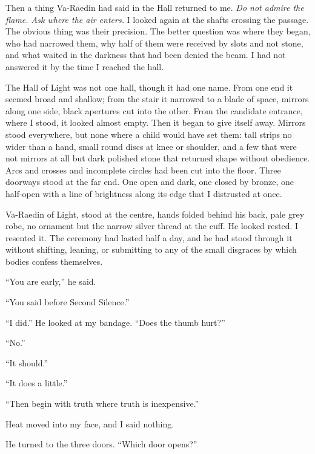 Then a thing Va-Raedin had said in the Hall returned to me. \textit{Do not admire the flame. Ask where the air enters.}
I looked again at the shafts crossing the passage.
The obvious thing was their precision.
The better question was where they began, who had narrowed them, why half of them were received by slots and not stone, and what waited in the darkness that had been denied the beam.
I had not answered it by the time I reached the hall.\par

The Hall of Light was not one hall, though it had one name.
From one end it seemed broad and shallow; from the stair it narrowed to a blade of space, mirrors along one side, black apertures cut into the other.
From the candidate entrance, where I stood, it looked almost empty.
Then it began to give itself away.
Mirrors stood everywhere, but none where a child would have set them: tall strips no wider than a hand, small round discs at knee or shoulder,
and a few that were not mirrors at all but dark polished stone that returned shape without obedience.
Arcs and crosses and incomplete circles had been cut into the floor.
Three doorways stood at the far end.
One open and dark, one closed by bronze, one half-open with a line of brightness along its edge that I distrusted at once.\par

Va-Raedin of Light, stood at the centre, hands folded behind his back, pale grey robe, no ornament but the narrow silver thread at the cuff.
He looked rested.
I resented it.
The ceremony had lasted half a day, and he had stood through it without shifting, leaning, or submitting to any of the small disgraces by which bodies confess themselves.\par

``You are early,'' he said.\par
``You said before Second Silence.''\par
``I did.'' He looked at my bandage. ``Does the thumb hurt?''\par
``No.''\par
``It should.''\par
``It does a little.''\par
``Then begin with truth where truth is inexpensive.''\par

Heat moved into my face, and I said nothing.\par

He turned to the three doors. ``Which door opens?''\par

